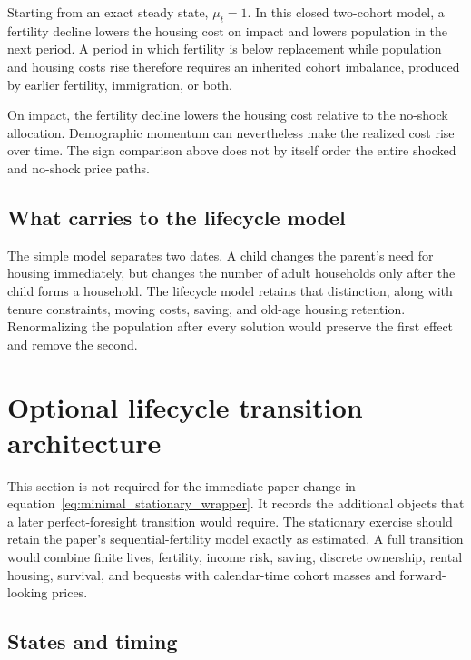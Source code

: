 \documentclass[11pt]{article}
\theoremstyle{definition}
\newcommand{\1}{\mathbf 1}
\newif\iftechnicalappendix
\begin{document}
Starting from an exact steady state, $\mu_t=1$. In this closed two-cohort model,
a fertility decline lowers the housing cost on impact and lowers population in
the next period. A period in which fertility is below replacement while
population and housing costs rise therefore requires an inherited cohort
imbalance, produced by earlier fertility, immigration, or both.

On impact, the fertility decline lowers the housing cost relative to the
no-shock allocation. Demographic momentum can nevertheless make the realized
cost rise over time. The sign comparison above does not by itself order the
entire shocked and no-shock price paths.

\subsection{What carries to the lifecycle model}

The simple model separates two dates. A child changes the parent's need for
housing immediately, but changes the number of adult households only after the
child forms a household. The lifecycle model retains that distinction, along
with tenure constraints, moving costs, saving, and old-age housing retention.
Renormalizing the population after every solution would preserve the first
effect and remove the second.

\iftechnicalappendix
\section{Optional lifecycle transition architecture}
\label{sec:lifecycle}

This section is not required for the immediate paper change in
equation~\eqref{eq:minimal_stationary_wrapper}. It records the additional
objects that a later perfect-foresight transition would require. The stationary
exercise should retain the paper's sequential-fertility model exactly as
estimated. A full transition would combine finite lives, fertility, income
risk, saving, discrete ownership, rental housing, survival, and bequests with
calendar-time cohort masses and forward-looking prices.

\subsection{States and timing}
\end{document}
